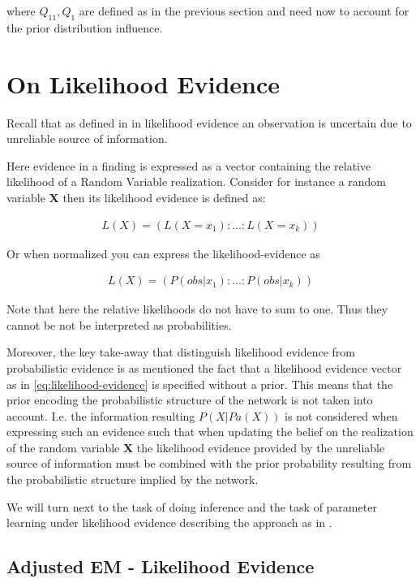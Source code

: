 \documentclass[11pt]{article}
\begin{document}
where \(Q_{11}, Q_1\) are defined as in the previous section and
need now to account for the prior distribution influence.


\section{On Likelihood Evidence}
\label{sec:org9076834}

Recall that as defined in \cite{Mrad_2015} in likelihood evidence an
observation is uncertain due to unreliable source of information.

Here evidence in a finding is expressed as a vector containing the
relative likelihood of a Random Variable realization. Consider for
instance a random variable \textbf{X} then its likelihood evidence is
defined as:

\begin{align} \label{eq:likelihood-evidence}
 L(X) = (L(X = x_1): ... : L(X = x_k))
\end{align}

Or when normalized you can express the likelihood-evidence as 

\begin{align} \label{eq:normalized-likelihood-evidence}
 L(X) = (P(obs | x_1): ... : P(obs | x_k))
\end{align}

Note that here the relative likelihoods do not have to sum to
one. Thus they cannot be not be interpreted as probabilities.

Moreover, the key take-away that distinguish likelihood evidence
from probabilistic evidence is as mentioned the fact that a
likelihood evidence vector as in \ref{eq:likelihood-evidence} is
specified without a prior. This means that the prior encoding the
probabilistic structure of the network is not taken into
account. I.e. the information resulting \(P(X|Pa(X))\) is not
considered when expressing such an evidence such that when
updating the belief on the realization of the random variable \textbf{X}
the likelihood evidence provided by the unreliable source of
information must be combined with the prior probability resulting
from the probabilistic structure implied by the network.

We will turn next to the task of doing inference and the task of
parameter learning under likelihood evidence describing the
approach as in \cite{Wasserkrug_all}.

\subsection{Adjusted EM - Likelihood Evidence}
\label{sec:org4fca43b}
\end{document}
